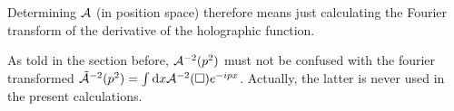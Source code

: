\documentclass[10pt,a4paper, fleqn]{article}
\begin{document}
Determining ${\cal A}$ (in position space) therefore means just calculating the Fourier transform of the derivative of the holographic function.

As told in the section before, ${\cal A}^{-2}(p^2)$ must not be  confused with the fourier transformed $\tilde{{\cal A}}^{-2}(p^2) = \int \mathrm{d} x {\cal A}^{-2}(\square) e^{-ipx}$. Actually, the latter is never used in the present calculations.

%
%
%
%
%
%
%
%
%
%
%
%
%
\end{document}
